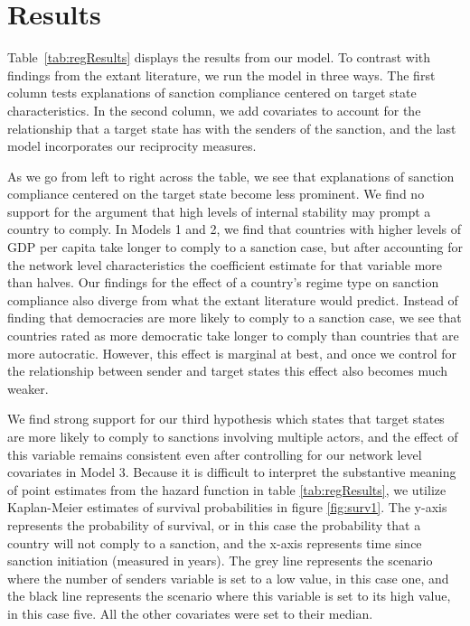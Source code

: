 \section*{Results}
\label{Results} 


\FloatBarrier

Table~\ref{tab:regResults} displays the results from our model. To contrast with findings from the extant literature, we run the model in three ways. The first column tests explanations of sanction compliance centered on target state characteristics. In the second column, we add covariates to account for the relationship that a target state has with the senders of the sanction, and the last model incorporates our reciprocity measures. 

As we go from left to right across the table, we see that explanations of sanction compliance centered on the target state become less prominent. We find no support for the argument that high levels of internal stability may prompt a country to comply. In Models 1 and 2, we find that countries with higher levels of GDP per capita take longer to comply to a sanction case, but after accounting for the network level characteristics the coefficient estimate for that variable more than halves. Our findings for the effect of a country's regime type on sanction compliance also diverge from what the extant literature would predict. Instead of finding that democracies are more likely to comply to a sanction case, we see that countries rated as more democratic take longer to comply than countries that are more autocratic. However, this effect is marginal at best, and once we control for the relationship between sender and target states this effect also becomes much weaker. 

We find strong support for our third hypothesis which states that target states are more likely to comply to sanctions involving multiple actors, and the effect of this variable remains consistent even after controlling for our network level covariates in Model 3. Because it is difficult to interpret the substantive meaning of point estimates from the hazard function in table \ref{tab:regResults}, we utilize Kaplan-Meier estimates of survival probabilities in figure \ref{fig:surv1}. The y-axis represents the probability of survival, or in this case the probability that a country will not comply to a sanction, and the x-axis represents time since sanction initiation (measured in years). The grey line represents the scenario where the number of senders variable is set to a low value, in this case one, and the black line represents the scenario where this variable is set to its high value, in this case five. All the other covariates were set to their median. 

